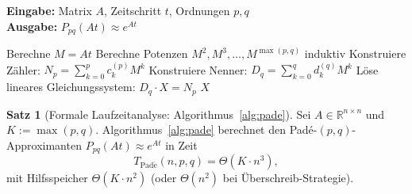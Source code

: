 \documentclass[a4paper,12pt]{report}
\theoremstyle{definition}
\newtheorem{satz}{Satz}
\begin{document}
	\begin{algorithm}[H]
		\caption{Padé-Approximation für Matrixexponential}
		\label{alg:pade}
		\textbf{Eingabe:} Matrix $A$, Zeitschritt $t$, Ordnungen $p, q$ \\
		\textbf{Ausgabe:} $P_{pq}(At) \approx e^{At}$
		\begin{algorithmic}[1]
			\State Berechne $M = At$
			\State Berechne Potenzen $M^2, M^3, \ldots, M^{\max(p,q)}$ induktiv
			\State Konstruiere Zähler: $N_p = \sum_{k=0}^p c_k^{(p)} M^k$
			\State Konstruiere Nenner: $D_q = \sum_{k=0}^q d_k^{(q)} M^k$
			\State Löse lineares Gleichungssystem: $D_q \cdot X = N_p$
			\State \Return $X$
		\end{algorithmic}
	\end{algorithm}

	\begin{satz}[Formale Laufzeitanalyse: Algorithmus~\ref{alg:pade}]
		\label{satz:laufzeit-pade}
		Sei $A \in \mathbb{R}^{n \times n}$ und $K := \max(p,q)$. Algorithmus~\ref{alg:pade} berechnet den Padé-$(p,q)$-Approximanten $P_{pq}(At) \approx e^{At}$ in Zeit
		\[
			T_{\mathrm{Pad\acute{e}}}(n, p, q) = \Theta(K \cdot n^3),
		\]
		mit Hilfsspeicher $\Theta(K \cdot n^2)$ (oder $\Theta(n^2)$ bei Überschreib-Strategie).
	\end{satz}
\end{document}

